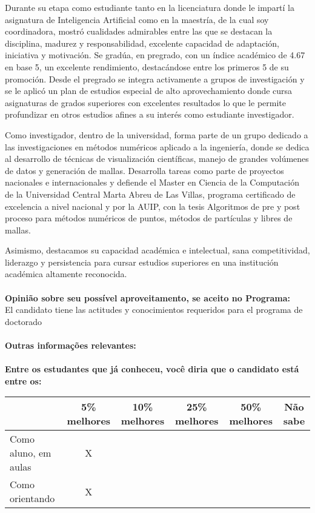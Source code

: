 \documentclass[11pt]{article}
\begin{document}
Durante su etapa como estudiante tanto en la licenciatura donde le impartí la asignatura de Inteligencia Artificial como en la maestría, de la cual soy coordinadora, mostró cualidades admirables entre las que se destacan la disciplina, madurez y responsabilidad, excelente capacidad de adaptación, iniciativa y motivación. Se gradúa, en pregrado, con un índice académico de 4.67 en base 5, un excelente rendimiento, destacándose entre los primeros 5 de su promoción. Desde el pregrado se integra activamente a grupos de investigación y se le aplicó un plan de estudios especial de alto aprovechamiento donde cursa asignaturas de grados superiores con excelentes resultados lo que le permite profundizar en otros estudios afines a su interés como estudiante investigador.

Como investigador, dentro de la universidad, forma parte de un grupo dedicado a las investigaciones en métodos numéricos aplicado a la ingeniería, donde se dedica al desarrollo de técnicas de visualización científicas, manejo de grandes volúmenes de datos y generación de mallas. Desarrolla tareas como parte de proyectos nacionales e internacionales y defiende el Master en Ciencia de la Computación de la Universidad Central Marta Abreu de Las Villas, programa certificado de excelencia a nivel nacional y por la AUIP, con la tesis Algoritmos de pre y post proceso para métodos numéricos de puntos, métodos de partículas y libres de mallas.

Asimismo, destacamos su capacidad académica e intelectual, sana competitividad, liderazgo y persistencia para cursar estudios superiores en una institución académica altamente reconocida. \\
\\
\textbf{Opinião sobre seu possível aproveitamento, se aceito no Programa:}
\\El candidato tiene  las actitudes y conocimientos requeridos para el programa de doctorado\\ 
\\
\textbf{Outras informações relevantes:} \\
\\[0.3cm]
\textbf{Entre os estudantes que já conheceu, você diria que o candidato está entre os:}
\\
\begin{tabular}{|l|c|c|c|c|c|}
\hline
 & 5\% melhores & 10\% melhores & 25\% melhores & 50\% melhores & Não sabe \\
\hline
Como aluno, em aulas & X &  &  &  & \\
\hline
Como orientando & X &  &  &  & \\
\hline
\end{tabular}
\end{document}
